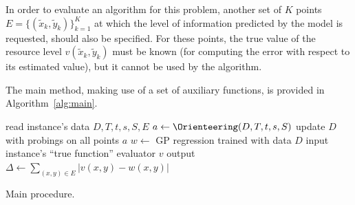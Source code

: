 \documentclass[smallextended]{svjour3}
\newcommand{\eq}{\leftarrow}
\newcommand{\sx}{{\tilde{x}}}	%
\newcommand{\sy}{{\tilde{y}}}
\begin{document}
In order to evaluate an algorithm for this problem, another set of $K$ points $E = \{(\sx_k,\sy_k)\}_{k=1}^{K}$ at which the level of information predicted by the model is requested, should also be specified.  For these points, the true value of the resource level $v(\sx_k,\sy_k)$ must be known (for computing the error with respect to its estimated value), but it cannot be used by the algorithm.

The main method, making use of a set of auxiliary functions, is provided in Algorithm~\ref{alg:main}.
\begin{algorithm}[!htbp]
  \begin{footnotesize}
    \DontPrintSemicolon
    read instance's data $D, T, t, s, S, E$\;
    $a \eq \Orienteering(D, T, t, s, S)$ \;
    update $D$ with probings on all points $a$\;
    $w \eq $ GP regression trained with data $D$\;
    input instance's ``true function'' evaluator $v$\;
    output $\Delta \eq \sum_{(x,y) \in E} {|v(x,y) - w(x,y)|}$\;
  \end{footnotesize}
  \caption{Main procedure.}
  \label{alg:main}
\end{algorithm}
\end{document}
